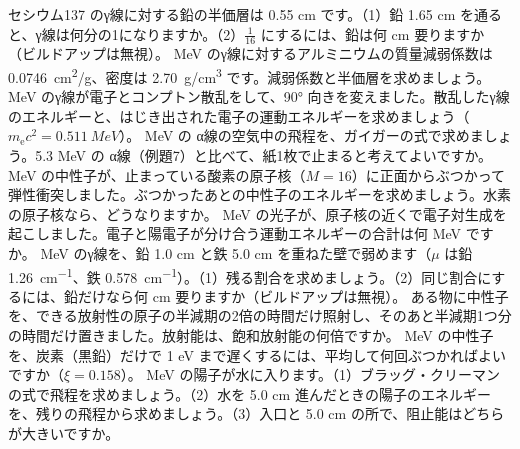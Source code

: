\bkendproblems
{}
\bkproblem セシウム137 のγ線に対する鉛の半価層は 0.55 cm です。（1）鉛 1.65 cm を通ると、γ線は何分の1になりますか。（2）$\tfrac1{16}$ にするには、鉛は何 cm 要りますか（ビルドアップは無視）。
 MeV のγ線に対するアルミニウムの質量減弱係数は \qty{0.0746}{cm^2/g}、密度は \qty{2.70}{g/cm^3} です。減弱係数と半価層を求めましょう。
 MeV のγ線が電子とコンプトン散乱をして、\ang{90} 向きを変えました。散乱したγ線のエネルギーと、はじき出された電子の運動エネルギーを求めましょう（$m_{\mathrm e}c^2=\qty{0.511}{MeV}$）。
 MeV の α線の空気中の飛程を、ガイガーの式で求めましょう。5.3 MeV の α線（例題7）と比べて、紙1枚で止まると考えてよいですか。
 MeV の中性子が、止まっている酸素の原子核（$M=16$）に正面からぶつかって弾性衝突しました。ぶつかったあとの中性子のエネルギーを求めましょう。水素の原子核なら、どうなりますか。
 MeV の光子が、原子核の近くで電子対生成を起こしました。電子と陽電子が分け合う運動エネルギーの合計は何 MeV ですか。
 MeV のγ線を、鉛 1.0 cm と鉄 5.0 cm を重ねた壁で弱めます（$\mu$ は鉛 \qty{1.26}{cm^{-1}}、鉄 \qty{0.578}{cm^{-1}}）。（1）残る割合を求めましょう。（2）同じ割合にするには、鉛だけなら何 cm 要りますか（ビルドアップは無視）。
\bkproblem ある物に中性子を、できる放射性の原子の半減期の2倍の時間だけ照射し、そのあと半減期1つ分の時間だけ置きました。放射能は、飽和放射能の何倍ですか。
 MeV の中性子を、炭素（黒鉛）だけで 1 eV まで遅くするには、平均して何回ぶつかればよいですか（$\xi=0.158$）。
 MeV の陽子が水に入ります。（1）ブラッグ・クリーマンの式で飛程を求めましょう。（2）水を 5.0 cm 進んだときの陽子のエネルギーを、残りの飛程から求めましょう。（3）入口と 5.0 cm の所で、阻止能はどちらが大きいですか。

